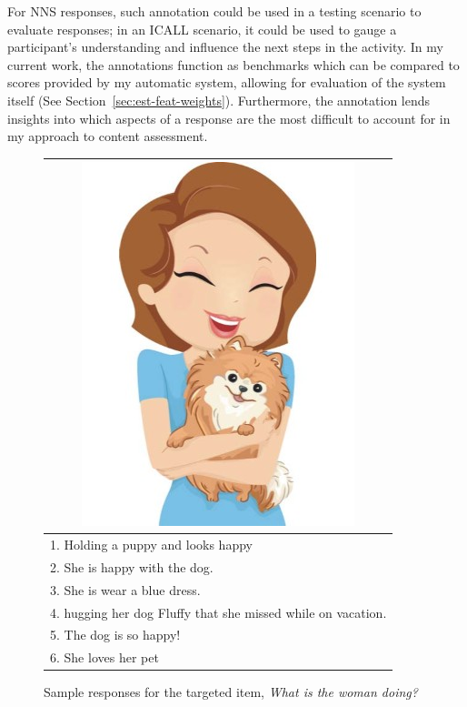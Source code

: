 For NNS responses, such annotation could be used in a testing scenario to evaluate responses; in an ICALL scenario, it could be used to gauge a participant's understanding and influence the next steps in the activity. In my current work, the annotations function as benchmarks which can be compared to scores provided by my automatic system, allowing for evaluation of the system itself (See Section~\ref{sec:est-feat-weights}). Furthermore, the annotation lends insights into which aspects of a response are the most difficult to account for in my approach to content assessment.

\begin{figure}[htb!]
\begin{center}
\begin{tabular}{|l|}
\hline
\multicolumn{1}{|c|}{\includegraphics[width=0.45\columnwidth]{figures/I29.jpg}} \\
\hline
1. Holding a puppy and looks happy \\
\hline
2. She is happy with the dog. \\
\hline
3. She is wear a blue dress. \\
\hline
4. hugging her dog Fluffy that she missed while on vacation. \\
\hline
5. The dog is so happy! \\
\hline
6. She loves her pet \\
\hline
\end{tabular}
\caption{\label{fig:sample-responses} Sample responses for the targeted item, \textit{What is the woman doing?}}
\end{center}
\end{figure}

